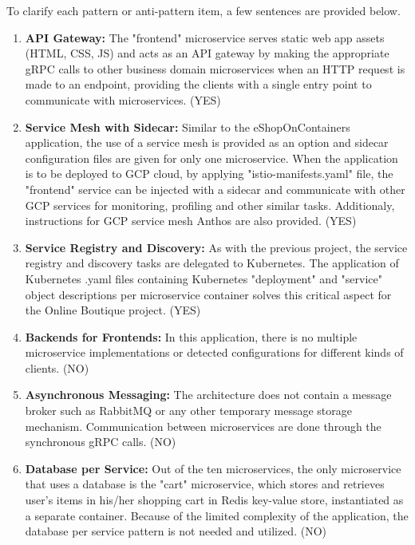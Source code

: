 \documentclass{Configuration_Files/PoliMi3i_thesis}
\begin{document}
To clarify each pattern or anti-pattern item, a few sentences are provided below.

\begin{enumerate}
    \item \textbf{API Gateway:} The "frontend" microservice serves static web app assets (HTML, CSS, JS) and acts as an API gateway by making the appropriate gRPC calls to other business domain microservices when an HTTP request is made to an endpoint, providing the clients with a single entry point to communicate with microservices. (YES)
    
    \item \textbf{Service Mesh with Sidecar:} Similar to the eShopOnContainers application, the use of a service mesh is provided as an option and sidecar configuration files are given for only one microservice.
    When the application is to be deployed to GCP cloud, by applying "istio-manifests.yaml" file, the "frontend" service can be injected with a sidecar and communicate with other GCP services for monitoring, profiling and other similar tasks. 
    Additionaly, instructions for GCP service mesh Anthos are also provided. (YES)
    
    \item \textbf{Service Registry and Discovery:} As with the previous project, the service registry and discovery tasks are delegated to Kubernetes.
    The application of Kubernetes .yaml files containing Kubernetes "deployment" and "service" object descriptions per microservice container solves this critical aspect for the Online Boutique project. (YES)
    
    \item \textbf{Backends for Frontends:} In this application, there is no multiple microservice implementations or detected configurations for different kinds of clients. (NO)
    
    \item \textbf{Asynchronous Messaging:} The architecture does not contain a message broker such as RabbitMQ or any other temporary message storage mechanism.
    Communication between microservices are done through the synchronous gRPC calls. (NO)
    
    \item \textbf{Database per Service:} Out of the ten microservices, the only microservice that uses a database is the "cart" microservice, which stores and retrieves user's items in his/her shopping cart in Redis key-value store, instantiated as a separate container.
    Because of the limited complexity of the application, the database per service pattern is not needed and utilized. (NO)
    

\end{enumerate}
\end{document}
